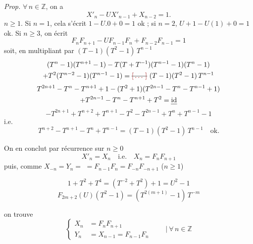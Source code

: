 \documentclass[11pt,a4paper]{article}
\begin{document}
\emph{Prop.} $\forall\, n \in \mathbb{Z}$, on a
\[
  X'_n - U X'_{n-1} + X_{n-2} = 1.
\]
\struck{\ill{}}  $n \geq 1$.  Si $n = 1$, cela s'écrit $1 - U.0 + 0 = 1$ ok ; si $n = 2$,  $U + 1 - U(1) + 0 = 1$ ok. Si $n \geq 3$, on écrit
\[
  F_n F_{n+1} - U F_{n-1} F_n + F_{n-2} F_{n-1} = 1
\]
soit, en multipliant par $(T-1)(T^2-1)\, T^{n-1}$
\[
  \begin{gathered}
    (T^n - 1)(T^{n+1} - 1) - T(T + T^{-1})(T^{n-1} - 1)(T^n - 1)\\
    + T^2 (T^{n-2} - 1)(T^{n-1} - 1) = \text{\struck{\ill{}}}\ (T-1)(T^2-1)\, T^{n-1}
  \end{gathered}
\]
\[
  \begin{gathered}
    T^{2n+1} - T^n - T^{n+1} + 1 - (T^2 + 1)(T^{2n-1} - T^n - T^{n-1} + 1)\\
    + T^{2n-1} - T^n - T^{n+1} + T^2 = \text{\uncertain{id}}
  \end{gathered}
\]
\[
  -T^{2n+1} + T^{n+2} + T^{n+1} - T^2 - T^{2n-1} + T^n + T^{n-1} - 1
\]
i.e.
\[
  T^{n+2} - T^{n+1} - T^n + T^{n-1} = (T-1)(T^2-1)\, T^{n-1} \quad \text{ok.}
\]

On en conclut par récurrence sur $n \geq 0$
\[
  X'_n = X_n \quad \text{i.e.} \quad X_n = F_n F_{n+1}
\]
puis, comme $X_{-n} = Y_n =$  \struck{\ill{}} $= F_{n-1} F_n = F_{-n} F_{-n+1}$ ($n \geq 1$)

\[
  1 + T^2 + T^4 = (T^{-2} + T^2) + 1 = U^2 - 1
\]
\[
  F_{2m+2}(U)(T^2 - 1) = (T^{2(m+1)} - 1)\, T^{-m}
\]

on trouve
\[
  \left\{
  \begin{aligned}
    X_n &= F_n F_{n+1}\\
    Y_n &= X_{n-1} = F_{n-1} F_n
  \end{aligned}
  \right. \qquad \Big|\ \forall\, n \in \mathbb{Z}
\]
\end{document}

